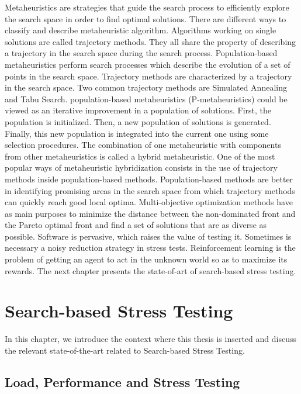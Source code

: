 \documentclass[espaco=umemeio,chapter=TITLE,twoside,openright]{abnt}
\begin{document}
Metaheuristics are strategies that guide the search process to efficiently explore the search space in order to find optimal solutions. There are different ways to classify and describe metaheuristic algorithm. Algorithms working on single solutions are called trajectory methods. They all share the property of describing a trajectory in the search space during the search process. Population-based metaheuristics perform search processes which describe the evolution of a set of points in the search space. Trajectory methods are characterized by a trajectory in the search space. Two common trajectory methods are Simulated Annealing and Tabu Search. population-based metaheuristics (P-metaheuristics) could be viewed as an iterative improvement in a population of solutions. First, the population is initialized. Then, a new population of solutions is generated. Finally, this new population is integrated into the current one using some selection procedures. The combination of one metaheuristic with components from other metaheuristics is called a hybrid metaheuristic. One of the most popular ways of metaheuristic hybridization consists in the use of trajectory methods inside population-based methods. Population-based methods are better in identifying promising areas in the search space from which trajectory methods can quickly reach good local optima. Multi-objective optimization methods have as main purposes to minimize the distance between the non-dominated front and the Pareto optimal front and find a set of solutions that are as diverse as possible. Software is pervasive, which raises the value of testing it. Sometimes is necessary a noisy reduction strategy in stress tests. Reinforcement learning is the problem of getting an agent to act in the unknown world so as to maximize its rewards. The next chapter presents the state-of-art of search-based stress testing.

\chapter{Search-based Stress Testing}

In this chapter, we introduce the context where this thesis is inserted and discuss the relevant state-of-the-art related to Search-based Stress Testing.

\section{Load, Performance and Stress Testing}
\end{document}
